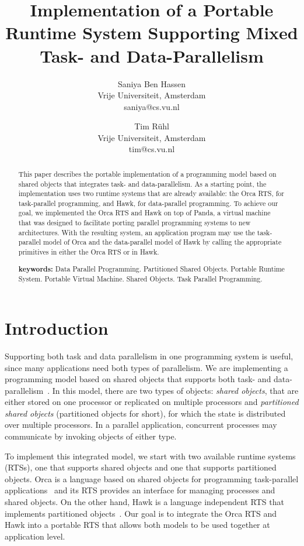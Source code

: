\documentclass{article}
\title{Implementation of a Portable Runtime System Supporting Mixed
Task- and Data-Parallelism}
\author{Saniya Ben Hassen \\ Vrije Universiteit,
Amsterdam \\ saniya@cs.vu.nl \and Tim R\"uhl \\ Vrije Universiteit,
Amsterdam \\ tim@cs.vu.nl }
\date{}
\begin{document}
\maketitle

\begin{abstract}
  This paper describes the portable implementation of a programming
  model based on shared objects that integrates task- and
  data-parallelism. As a starting point, the implementation uses two
  runtime systems that are already available: the Orca RTS, for
  task-parallel programming, and Hawk, for data-parallel programming.
  To achieve our goal, we implemented the Orca RTS and Hawk on top of
  Panda, a virtual machine that was designed to facilitate porting
  parallel programming systems to new architectures. With the
  resulting system, an application program may use the task-parallel
  model of Orca and the data-parallel model of Hawk by calling the
  appropriate primitives in either the Orca RTS or in Hawk.

  \vspace{0.5cm}
  \textbf{keywords:} Data Parallel Programming.  Partitioned Shared
  Objects. Portable Runtime System. Portable Virtual Machine. Shared
  Objects. Task Parallel Programming.
\end{abstract}


\section{Introduction}
\label{sec:intro}

Supporting both task and data parallelism in one programming system is
useful, since many applications need both types of parallelism. We are
implementing a programming model based on shared objects that supports
both task- and data-parallelism~\cite{benhassen96b}. In this model,
there are two types of objects: \emph{shared objects}, that are either
stored on one processor or replicated on multiple processors and
\emph{partitioned shared objects} (partitioned objects for short), for
which the state is distributed over multiple processors. In a parallel
application, concurrent processes may communicate by invoking objects
of either type.

To implement this integrated model, we start with two available
runtime systems (RTSs), one that supports shared objects and one that
supports partitioned objects. Orca is a language based on
shared objects for programming task-parallel applications~\cite{bal92}
and its RTS provides an interface for managing processes and shared
objects. On the other hand, Hawk is a language independent RTS that
implements partitioned objects~\cite{benhassen96}. Our goal is
to integrate the Orca RTS and Hawk into a portable RTS that allows
both models to be used together at application level.
\end{document}
